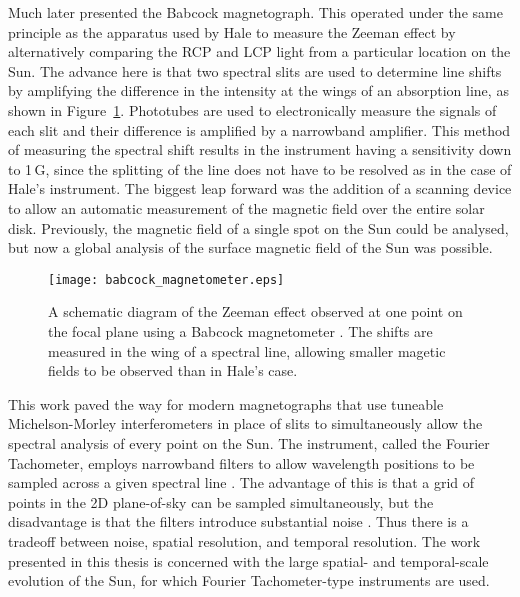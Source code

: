 Much later \citep{Babcock:1953} presented the Babcock magnetograph. This operated under the same principle as the apparatus used by Hale to measure the Zeeman effect by alternatively comparing the \gls{RCP} and \gls{LCP} light from a particular location on the Sun. The advance here is that two spectral slits are used to determine line shifts by amplifying the difference in the intensity at the wings of an absorption line, as shown in Figure~\ref{fig:babcockmagnetometer}. Phototubes are used to electronically measure the signals of each slit and their difference is amplified by a narrowband amplifier. This method of measuring the spectral shift results in the instrument having a sensitivity down to 1\,G, since the splitting of the line does not have to be resolved as in the case of Hale's instrument. The biggest leap forward was the addition of a scanning device to allow an automatic measurement of the magnetic field over the entire solar disk. Previously, the magnetic field of a single spot on the Sun could be analysed, but now a global analysis of the surface magnetic field of the Sun was possible. %

\begin{figure}[!t]
\centerline{\texttt{[image: babcock\_magnetometer.eps]}}
\caption[A schematic of Babcock's Zeeman effect measurement.]{A schematic diagram of the Zeeman effect observed at one point on the focal plane using a Babcock magnetometer \citep[from][]{Babcock:1953}. The shifts are measured in the wing of a spectral line, allowing smaller magetic fields to be observed than in Hale's case.}\label{fig:babcockmagnetometer}
\end{figure}

This work paved the way for modern magnetographs that use tuneable Michelson-Morley interferometers in place of slits to simultaneously allow the spectral analysis of every point on the Sun. The instrument, called the Fourier Tachometer, employs narrowband filters to allow wavelength positions to be sampled across a given spectral line \citep{Dunn:1980}. The advantage of this is that a grid of points in the 2D plane-of-sky can be sampled simultaneously, but the disadvantage is that the filters introduce substantial noise \citep{Brown:1984}. Thus there is a tradeoff between noise, spatial resolution, and temporal resolution. The work presented in this thesis is concerned with the large spatial- and temporal-scale evolution of the Sun, for which Fourier Tachometer-type instruments are used.


